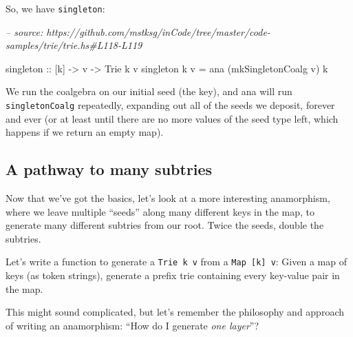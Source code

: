 \documentclass[]{article}
\newenvironment{Shaded}{}{}
\newcommand{\CharTok}[1]{\textcolor[rgb]{0.25,0.44,0.63}{#1}}
\newcommand{\CommentTok}[1]{\textcolor[rgb]{0.38,0.63,0.69}{\textit{#1}}}
\newcommand{\DataTypeTok}[1]{\textcolor[rgb]{0.56,0.13,0.00}{#1}}
\newcommand{\DecValTok}[1]{\textcolor[rgb]{0.25,0.63,0.44}{#1}}
\newcommand{\FunctionTok}[1]{\textcolor[rgb]{0.02,0.16,0.49}{#1}}
\newcommand{\NormalTok}[1]{#1}
\newcommand{\OtherTok}[1]{\textcolor[rgb]{0.00,0.44,0.13}{#1}}
\newcommand{\StringTok}[1]{\textcolor[rgb]{0.25,0.44,0.63}{#1}}
\begin{document}
So, we have \texttt{singleton}:

\begin{Shaded}
\begin{Highlighting}[]
\CommentTok{-- source: https://github.com/mstksg/inCode/tree/master/code-samples/trie/trie.hs#L118-L119}

\OtherTok{singleton ::}\NormalTok{ [k] }\OtherTok{->}\NormalTok{ v }\OtherTok{->} \DataTypeTok{Trie}\NormalTok{ k v}
\NormalTok{singleton k v }\FunctionTok{=}\NormalTok{ ana (mkSingletonCoalg v) k}
\end{Highlighting}
\end{Shaded}

We run the coalgebra on our initial seed (the key), and ana will run
\texttt{singletonCoalg} repeatedly, expanding out all of the seeds we deposit,
forever and ever (or at least until there are no more values of the seed type
left, which happens if we return an empty map).

\begin{Shaded}
\end{Shaded}

\hypertarget{a-pathway-to-many-subtries}{%
\subsection{A pathway to many subtries}\label{a-pathway-to-many-subtries}}

Now that we've got the basics, let's look at a more interesting anamorphism,
where we leave multiple ``seeds'' along many different keys in the map, to
generate many different subtries from our root. Twice the seeds, double the
subtries.

Let's write a function to generate a \texttt{Trie\ k\ v} from a
\texttt{Map\ {[}k{]}\ v}: Given a map of keys (as token strings), generate a
prefix trie containing every key-value pair in the map.

This might sound complicated, but let's remember the philosophy and approach of
writing an anamorphism: ``How do I generate \emph{one layer}''?
\end{document}
